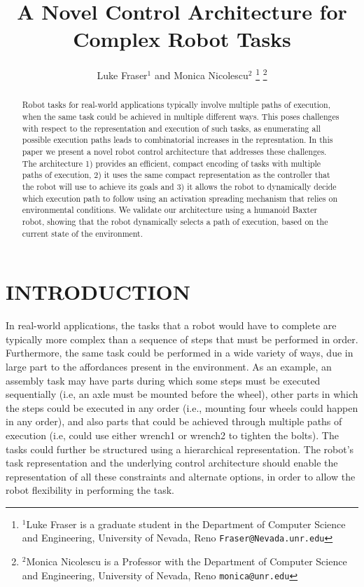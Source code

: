\documentclass[letterpaper, 10 pt, conference]{ieeeconf}  %
\title{\LARGE \bf
A Novel Control Architecture for Complex Robot Tasks
}
\author{Luke Fraser$^{1}$ and Monica Nicolescu$^{2}$%
\thanks{$^{1}$Luke Fraser is a graduate student in the Department of Computer Science and Engineering,
        University of Nevada, Reno
        {\tt\small Fraser@Nevada.unr.edu}}%
\thanks{$^{2}$Monica Nicolescu is a Professor with the Department of Computer Science and Engineering, University of Nevada, Reno
        {\tt\small monica@unr.edu}}%
}
\begin{document}
\maketitle
\thispagestyle{empty}
\pagestyle{empty}

\begin{abstract}
Robot tasks for real-world applications typically involve multiple paths of execution, when the same task could be achieved in multiple different ways. This poses challenges with respect to the representation and execution of such tasks, as enumerating all possible execution paths leads to combinatorial increases in the represntation. In this paper we present a novel robot control architecture that addresses these challenges. The architecture 1) provides an efficient, compact encoding of tasks with multiple paths of execution, 2) it uses the same compact representation as the controller that the robot will use to achieve its goals and 3) it allows the robot to dynamically decide which execution path to follow using an activation spreading mechanism that relies on environmental conditions. We validate our architecture using a humanoid Baxter robot, showing that the robot dynamically selects a path of execution, based on the current state of the environment.

\end{abstract}


\section{INTRODUCTION}


In real-world applications, the tasks that a robot would have to complete are typically more complex than a sequence of steps that must be performed in order. Furthermore, the same task could be performed in a wide variety of ways, due in large part to the affordances present in the environment. As an example, an assembly task may have parts during which some steps must be executed sequentially (i.e, an axle must be mounted before the wheel), other parts in which the steps could be executed in any order (i.e., mounting four wheels could happen in any order), and also parts that could be achieved through multiple paths of execution (i.e, could use either wrench1 or wrench2 to tighten the bolts). The tasks could further be structured using a hierarchical representation. The robot's task representation and the underlying control architecture should enable the representation of all these constraints and alternate options, in order to allow the robot flexibility in performing the task. 
\end{document}
